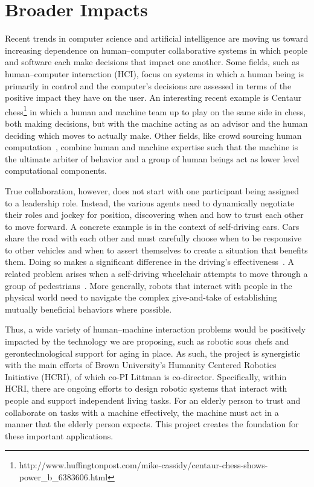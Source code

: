 
\section{Broader Impacts}

Recent trends in computer science and artificial intelligence are
moving us toward increasing dependence on human--computer
collaborative systems in which people and software each make decisions
that impact one another. Some fields, such as human--computer
interaction (HCI), focus on systems in which a human being is
primarily in control and the computer's decisions are assessed in
terms of the positive impact they have on the user. An interesting
recent example is Centaur
chess\footnote{http://www.huffingtonpost.com/mike-cassidy/centaur-chess-shows-power_b_6383606.html}
in which a human and machine team up to play on the same side in
chess, both making decisions, but with the machine acting as an
advisor and the human deciding which moves to actually make. Other
fields, like crowd sourcing human computation~\cite{von2009human},
combine human and machine expertise such that the machine is the
ultimate arbiter of behavior and a group of human beings act as lower
level computational components.

True collaboration, however, does not start with one participant being
assigned to a leadership role. Instead, the various agents need to
dynamically negotiate their roles and jockey for position, discovering
when and how to trust each other to move forward. A concrete example
is in the context of self-driving cars. Cars share the road with each
other and must carefully choose when to be responsive to other
vehicles and when to assert themselves to create a situation that
benefits them. Doing so makes a significant difference in the driving's
effectiveness~\cite{cunningham2015mpdm}. A related problem arises when
a self-driving wheelchair attempts to move through a group of
pedestrians~\cite{kim2016socially}. More generally, robots that
interact with people in the physical world need to navigate the
complex give-and-take of establishing mutually beneficial behaviors
where possible.

Thus, a wide variety of human--machine interaction problems would be
positively impacted by the technology we are proposing, such as
robotic sous chefs and gerontechnological support for aging in place.
As such, the project is synergistic with the main efforts of Brown
University's Humanity Centered Robotics Initiative (HCRI), of which
co-PI Littman is co-director. Specifically, within HCRI, there are
ongoing efforts to design robotic systems that interact with people
and support independent living tasks. For an elderly person to trust
and collaborate on tasks with a machine effectively, the machine must
act in a manner that the elderly person expects. This project creates
the foundation for these important applications.

